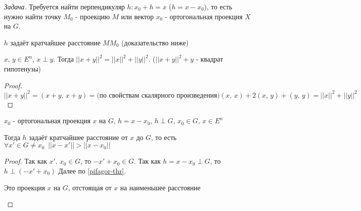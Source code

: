 
\textit{Задача.  } Требуется найти перпендикуляр $h: x_0 + h = x$ ($h = x - x_0$), то есть нужно найти точку $M_0$ - 
проекцию $M$ или вектор $x_0$ - ортогональная проекция $X$ на $G$.

\begin{remark}
    $h$ задаёт кратчайшее расстояние $MM_0$ (доказательство ниже)
\end{remark}

\begin{lemma}
    $x, \, y \in E^n, \, x \perp y.$ Тогда $||x+y||^2 = ||x||^2 + ||y||^2$. ($||x+y||^2+y$ - квадрат гипотенузы)
\end{lemma}

\begin{proof}
    $||x+y||^2 = (x+y, \, x+y) = \text{(по свойствам скалярного произведения)} (x, \, x) + 2(x, \, y) + (y, \, y) = ||x||^2 + ||y||^2$
\end{proof}

\begin{theorem}
    $x_0$ - ортогональная проекция $x$ на $G$, $h=x-x_0$, $h \perp G$, $x_0 \in G$, $x \in E^n$
    
    Тогда $h$ задаёт кратчайшее расстояние от $x$ до $G$, то есть $\forall x' \in G \neq x_0 \,\,\, ||x-x'|| > ||x-x_0||$ 
\end{theorem}
\begin{proof}
    Так как $x', \, x_0 \in G$, то $-x'+x_0 \in G$. Так как $h = x - x_0 \perp G$, то $h \perp (-x' + x_0)$
    Далее по \ref{pifagor-thr}.
    \begin{remark}
        Это проекция $x$ на $G$, отстоящая от $x$ на наименьшее расстояние
    \end{remark}
\end{proof}